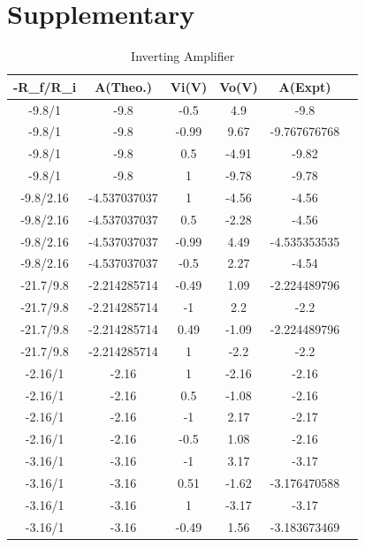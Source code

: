 \documentclass[10pt]{scrartcl}
\theoremstyle{definition}
\begin{document}
\section{Supplementary}
\begin{table}[!ht]
    \centering
    \begin{tabular}{|c|c|c|c|c|c|}
    \hline
        \textbf{-R\_f/R\_i} & \textbf{A(Theo.)} & \textbf{Vi(V)} & \textbf{Vo(V)} & \textbf{A(Expt)} \\ \hline
        -9.8/1 & -9.8 & -0.5 & 4.9 & -9.8 \\ \hline
        -9.8/1 & -9.8 & -0.99 & 9.67 & -9.767676768 \\ \hline
        -9.8/1 & -9.8 & 0.5 & -4.91 & -9.82 \\ \hline
        -9.8/1 & -9.8 & 1 & -9.78 & -9.78 \\ \hline
        -9.8/2.16 & -4.537037037 & 1 & -4.56 & -4.56 \\ \hline
        -9.8/2.16 & -4.537037037 & 0.5 & -2.28 & -4.56 \\ \hline
        -9.8/2.16 & -4.537037037 & -0.99 & 4.49 & -4.535353535 \\ \hline
        -9.8/2.16 & -4.537037037 & -0.5 & 2.27 & -4.54 \\ \hline
        -21.7/9.8 & -2.214285714 & -0.49 & 1.09 & -2.224489796 \\ \hline
        -21.7/9.8 & -2.214285714 & -1 & 2.2 & -2.2 \\ \hline
        -21.7/9.8 & -2.214285714 & 0.49 & -1.09 & -2.224489796 \\ \hline
        -21.7/9.8 & -2.214285714 & 1 & -2.2 & -2.2 \\ \hline
        -2.16/1 & -2.16 & 1 & -2.16 & -2.16 \\ \hline
        -2.16/1 & -2.16 & 0.5 & -1.08 & -2.16 \\ \hline
        -2.16/1 & -2.16 & -1 & 2.17 & -2.17 \\ \hline
        -2.16/1 & -2.16 & -0.5 & 1.08 & -2.16 \\ \hline
        -3.16/1 & -3.16 & -1 & 3.17 & -3.17 \\ \hline
        -3.16/1 & -3.16 & 0.51 & -1.62 & -3.176470588 \\ \hline
        -3.16/1 & -3.16 & 1 & -3.17 & -3.17 \\ \hline
        -3.16/1 & -3.16 & -0.49 & 1.56 & -3.183673469 \\ \hline
    \end{tabular}
    \caption{Inverting Amplifier}
\end{table}
\end{document}
